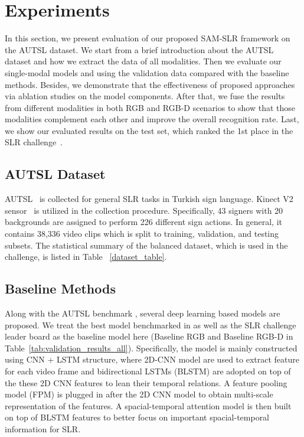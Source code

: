 \documentclass[final]{cvpr}
\begin{document}
\section{Experiments}
In this section, we present evaluation of our proposed SAM-SLR framework on the AUTSL dataset. We start from a brief introduction about the AUTSL dataset and how we extract the data of all modalities. Then we evaluate our single-modal models and using the validation data compared with the baseline methods. Besides, we demonstrate that the effectiveness of proposed approaches via ablation studies on the model components. After that, we fuse the results from different modalities in both RGB and RGB-D scenarios to show that those modalities complement each other and improve the overall recognition rate. Last, we show our evaluated results on the test set, which ranked the 1st place in the SLR challenge~\cite{Sincan:CVPRW:2021}. 

\subsection{AUTSL Dataset}
AUTSL~\cite{SLR_dataset} is collected for general SLR tasks in Turkish sign language. Kinect V2 sensor~\cite{kinect_v1v2,kinect2_acc} is utilized in the collection procedure. Specifically, 43 signers with 20 backgrounds are assigned to perform 226 different sign actions. In general, it contains 38,336 video clips which is split to training, validation, and testing subsets. 
The statistical summary of the balanced dataset, which is used in the challenge, is listed in Table ~\ref{dataset_table}.




\subsection{Baseline Methods}
Along with the AUTSL benchmark \cite{SLR_dataset}, several deep learning based models are proposed. We treat the best model benchmarked in \cite{SLR_dataset} as well as the SLR challenge leader board as the baseline model here (Baseline RGB and Baseline RGB-D in Table~\ref{tab:validation_results_all}). Specifically, the model is mainly constructed using CNN + LSTM structure, where 2D-CNN model are used to extract feature for each video frame and bidirectional LSTMs (BLSTM) are adopted on top of the these 2D CNN features to lean their temporal relations. A feature pooling model (FPM) \cite{sincan2019isolated} is plugged in after the 2D CNN model to obtain multi-scale representation of the features. A spacial-temporal attention model \cite{raffel2015feed} is then built on top of BLSTM features to better focus on important spacial-temporal information for SLR.
\end{document}
